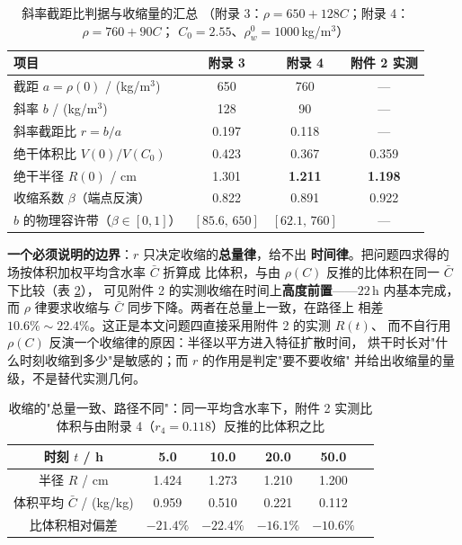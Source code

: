 \documentclass[12pt,a4paper,fontset=none]{ctexart}
\begin{document}
\begin{table}[htb]
  \centering
  \caption{斜率截距比判据与收缩量的汇总
    （附录 3：$\rho=650+128C$；附录 4：$\rho=760+90C$；
    $C_0=2.55$、$\rho_w^0=1000$\,kg/m$^3$）}
  \label{tab:r-crit}
  \small
  \setlength{\tabcolsep}{5pt}
  \begin{tabular}{lccc}
    \toprule
    项目 & 附录 3 & 附录 4 & 附件 2 实测 \\
    \midrule
    截距 $a=\rho(0)$ / (kg/m$^3$) & 650 & 760 & --- \\
    斜率 $b$ / (kg/m$^3$)         & 128 & 90  & --- \\
    斜率截距比 $r=b/a$            & 0.197 & 0.118 & --- \\
    绝干体积比 $V(0)/V(C_0)$      & 0.423 & 0.367 & 0.359 \\
    绝干半径 $R(0)$ / cm          & 1.301 & \textbf{1.211} & \textbf{1.198} \\
    收缩系数 $\beta$（端点反演）  & 0.822 & 0.891 & 0.922 \\
    $b$ 的物理容许带（$\beta\in[0,1]$）
      & $[85.6,\,650]$ & $[62.1,\,760]$ & --- \\
    \bottomrule
  \end{tabular}
\end{table}

\textbf{一个必须说明的边界}：$r$ 只决定收缩的\textbf{总量律}，给不出
\textbf{时间律}。把问题四求得的场按体积加权平均含水率 $\bar C$ 折算成
比体积，与由 $\rho(C)$ 反推的比体积在同一 $\bar C$ 下比较（表 \ref{tab:r-path}），
可见附件 2 的实测收缩在时间上\textbf{高度前置}——$22$\,h 内基本完成，
而 $\rho$ 律要求收缩与 $\bar C$ 同步下降。两者在总量上一致，在路径上
相差 $10.6\%\sim22.4\%$。这正是本文问题四直接采用附件 2 的实测 $R(t)$、
而不自行用 $\rho(C)$ 反演一个收缩律的原因：半径以平方进入特征扩散时间，
烘干时长对"什么时刻收缩到多少"是敏感的；而 $r$ 的作用是判定"要不要收缩"
并给出收缩量的量级，不是替代实测几何。

\begin{table}[htbp]
  \centering
  \caption{收缩的"总量一致、路径不同"：同一平均含水率下，附件 2 实测比
    体积与由附录 4（$r_4=0.118$）反推的比体积之比}
  \label{tab:r-path}
  \small
  \begin{tabular}{cccccc}
    \toprule
    时刻 $t$ / h      & 5.0 & 10.0 & 20.0 & 50.0 \\
    \midrule
    半径 $R$ / cm      & 1.424 & 1.273 & 1.210 & 1.200 \\
    体积平均 $\bar C$ / (kg/kg) & 0.959 & 0.510 & 0.221 & 0.112 \\
    比体积相对偏差      & $-21.4\%$ & $-22.4\%$ & $-16.1\%$ & $-10.6\%$ \\
    \bottomrule
  \end{tabular}
\end{table}
\end{document}
